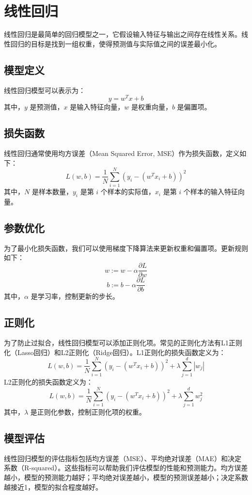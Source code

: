 \documentclass{article}
\begin{document}
\section{线性回归}
线性回归是最简单的回归模型之一，它假设输入特征与输出之间存在线性关系。线性回归的目标是找到一组权重，使得预测值与实际值之间的误差最小化。
\subsection{模型定义}
线性回归模型可以表示为：
\begin{equation}
y = w^T x + b
\end{equation}
其中，$y$ 是预测值，$x$ 是输入特征向量，$w$ 是权重向量，$b$ 是偏置项。
\subsection{损失函数}
线性回归通常使用均方误差（Mean Squared Error, MSE）作为损失函数，定义如下：
\begin{equation}L(w, b) = \frac{1}{N} \sum_{i=1}^{N} (y_i - (w^T x_i + b))^2\end{equation}
其中，$N$ 是样本数量，$y_i$ 是第 $i$ 个样本的实际值，$x_i$ 是第 $i$ 个样本的输入特征向量。
\subsection{参数优化}
为了最小化损失函数，我们可以使用梯度下降算法来更新权重和偏置项。更新规则如下：
\begin{equation}w := w - \alpha \frac{\partial L}{\partial w}\end{equation}
\begin{equation}b := b - \alpha \frac{\partial L}{\partial b}\end{equation}
其中，$\alpha$ 是学习率，控制更新的步长。
\subsection{正则化}
为了防止过拟合，线性回归模型可以添加正则化项。常见的正则化方法有L1正则化（Lasso回归）和L2正则化（Ridge回归）。L1正则化的损失函数定义为：
\begin{equation}L(w, b) = \frac{1}{N} \sum_{i=1}^{N} (y_i - (w^T x_i + b))^2 + \lambda \sum_{j=1}^{d} |w_j|\end{equation}
L2正则化的损失函数定义为：
\begin{equation}L(w, b) = \frac{1}{N} \sum_{i=1}^{N} (y_i - (w^T x_i + b))^2 + \lambda \sum_{j=1}^{d} w_j^2\end{equation}
其中，$\lambda$ 是正则化参数，控制正则化项的权重。
\subsection{模型评估}线性回归模型的评估指标包括均方误差（MSE）、平均绝对误差（MAE）和决定系数（R-squared）。这些指标可以帮助我们评估模型的性能和预测能力。均方误差越小，模型的预测能力越好；平均绝对误差越小，模型的预测误差越小；决定系数越接近1，模型的拟合程度越好。
\end{document}
